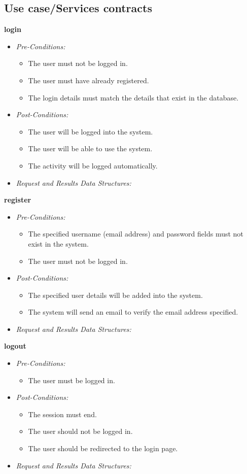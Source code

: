 \documentclass[a4paper,12pt]{article}
\begin{document}
\subsection{Use case/Services contracts}
\textbf{\large{login}}
	\begin{itemize}
		\item \textit{Pre-Conditions:}
			\begin{itemize}
				\item The user must not be logged in.
				\item The user must have already registered.
				\item The login details must match the details that exist in the database.
			\end{itemize}
		\item \textit{Post-Conditions:}
			\begin{itemize}
				\item The user will be logged into the system.
				\item The user will be able to use the system.
				\item The activity will be logged automatically.
			\end{itemize}
		\item \textit{Request and Results Data Structures:}
	\end{itemize}
\textbf{\large{register}}
	\begin{itemize}
		\item \textit{Pre-Conditions:}
			\begin{itemize}
				\item The specified username (email address) and password fields must not exist in the system.
				\item The user must not be logged in.
			\end{itemize}
		\item \textit{Post-Conditions:}
			\begin{itemize}
				\item The specified user details will be added into the system.
				\item The system will send an email to verify the email address specified.
			\end{itemize}
		\item \textit{Request and Results Data Structures:}
	\end{itemize}
\textbf{\large{logout}}
	\begin{itemize}
		\item \textit{Pre-Conditions:}
			\begin{itemize}
				\item The user must be logged in.
			\end{itemize}
		\item \textit{Post-Conditions:}
			\begin{itemize}
				\item The session must end.
				\item The user should not be logged in.
				\item The user should be redirected to the login page.
			\end{itemize}
		\item \textit{Request and Results Data Structures:}
	\end{itemize}
\end{document}
